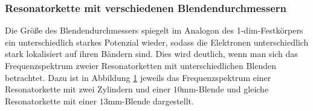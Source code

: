\subsubsection{Resonatorkette mit verschiedenen Blendendurchmessern}
Die Größe des Blendendurchmessers spiegelt im Analogon des 1-dim-Festkörpers ein unterschiedlich starkes
Potenzial wieder, sodass die Elektronen unterschiedlich stark lokalisiert auf ihren Bändern sind.
Dies wird deutlich, wenn man sich das Frequenzspektrum zweier Resonatorketten mit unterschiedlichen Blenden betrachtet.
Dazu ist in Abbildung \ref{fig:fest_2_blende} jeweils das Frequenzspektrum einer Resonatorkette mit zwei Zylindern und einer $10$mm-Blende
und gleiche Resonatorkette mit einer $13$mm-Blende dargestellt.\\
\begin{figure}[H]
    \centering
    \hfil
    \hfil 
    \caption{}
    \label{fig:fest_2_blende}
\end{figure}

